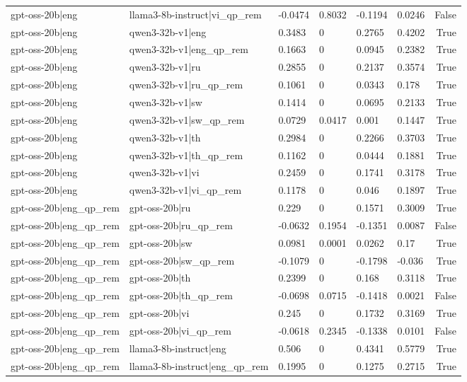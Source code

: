 \begin{table}
\begin{tabular}{llllllr}
gpt-oss-20b|eng & llama3-8b-instruct|vi_qp_rem & -0.0474 & 0.8032 & -0.1194 & 0.0246 & False \\
gpt-oss-20b|eng & qwen3-32b-v1|eng & 0.3483 & 0 & 0.2765 & 0.4202 & True \\
gpt-oss-20b|eng & qwen3-32b-v1|eng_qp_rem & 0.1663 & 0 & 0.0945 & 0.2382 & True \\
gpt-oss-20b|eng & qwen3-32b-v1|ru & 0.2855 & 0 & 0.2137 & 0.3574 & True \\
gpt-oss-20b|eng & qwen3-32b-v1|ru_qp_rem & 0.1061 & 0 & 0.0343 & 0.178 & True \\
gpt-oss-20b|eng & qwen3-32b-v1|sw & 0.1414 & 0 & 0.0695 & 0.2133 & True \\
gpt-oss-20b|eng & qwen3-32b-v1|sw_qp_rem & 0.0729 & 0.0417 & 0.001 & 0.1447 & True \\
gpt-oss-20b|eng & qwen3-32b-v1|th & 0.2984 & 0 & 0.2266 & 0.3703 & True \\
gpt-oss-20b|eng & qwen3-32b-v1|th_qp_rem & 0.1162 & 0 & 0.0444 & 0.1881 & True \\
gpt-oss-20b|eng & qwen3-32b-v1|vi & 0.2459 & 0 & 0.1741 & 0.3178 & True \\
gpt-oss-20b|eng & qwen3-32b-v1|vi_qp_rem & 0.1178 & 0 & 0.046 & 0.1897 & True \\
gpt-oss-20b|eng_qp_rem & gpt-oss-20b|ru & 0.229 & 0 & 0.1571 & 0.3009 & True \\
gpt-oss-20b|eng_qp_rem & gpt-oss-20b|ru_qp_rem & -0.0632 & 0.1954 & -0.1351 & 0.0087 & False \\
gpt-oss-20b|eng_qp_rem & gpt-oss-20b|sw & 0.0981 & 0.0001 & 0.0262 & 0.17 & True \\
gpt-oss-20b|eng_qp_rem & gpt-oss-20b|sw_qp_rem & -0.1079 & 0 & -0.1798 & -0.036 & True \\
gpt-oss-20b|eng_qp_rem & gpt-oss-20b|th & 0.2399 & 0 & 0.168 & 0.3118 & True \\
gpt-oss-20b|eng_qp_rem & gpt-oss-20b|th_qp_rem & -0.0698 & 0.0715 & -0.1418 & 0.0021 & False \\
gpt-oss-20b|eng_qp_rem & gpt-oss-20b|vi & 0.245 & 0 & 0.1732 & 0.3169 & True \\
gpt-oss-20b|eng_qp_rem & gpt-oss-20b|vi_qp_rem & -0.0618 & 0.2345 & -0.1338 & 0.0101 & False \\
gpt-oss-20b|eng_qp_rem & llama3-8b-instruct|eng & 0.506 & 0 & 0.4341 & 0.5779 & True \\
gpt-oss-20b|eng_qp_rem & llama3-8b-instruct|eng_qp_rem & 0.1995 & 0 & 0.1275 & 0.2715 & True \\

\end{tabular}
\end{table}
